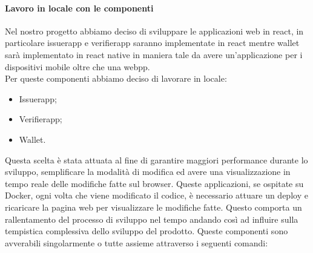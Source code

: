 \paragraph{Lavoro in locale con le componenti}
Nel nostro progetto abbiamo deciso di sviluppare le applicazioni web in react, in particolare issuerapp  e verifierapp saranno implementate in react mentre wallet sarà implementato in react native in maniera tale da avere un'applicazione per i dispositivi mobile oltre che una webpp. \\
Per queste componenti abbiamo deciso di lavorare in locale:
\begin{itemize}
\item Issuerapp;
\item Verifierapp;
\item Wallet.
\end{itemize}
Questa scelta è stata attuata al fine di garantire maggiori performance durante lo sviluppo, semplificare la modalità di modifica ed avere una visualizzazione in tempo reale delle modifiche fatte sul browser. 
Queste applicazioni, se ospitate su Docker, ogni volta che viene modificato il codice, è necessario attuare un deploy e ricaricare la pagina web per visualizzare le modifiche fatte. Questo comporta un rallentamento del processo di sviluppo nel tempo andando così ad influire sulla tempistica complessiva dello sviluppo del prodotto. 
Queste componenti sono avverabili singolarmente o tutte assieme attraverso i seguenti comandi:
